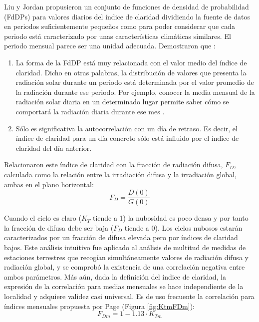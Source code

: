 Liu y Jordan propusieron un conjunto de funciones de densidad de probabilidad
(FdDPs) para valores diarios del índice de claridad dividiendo la
fuente de datos en periodos suficientemente pequeños como para poder
considerar que cada periodo está caracterizado por unas características
climáticas similares. El periodo mensual parece ser una unidad adecuada.
Demostraron que : 
\begin{enumerate}
\item La forma de la FdDP está muy relacionada con el valor medio del índice
de claridad. Dicho en otras palabras, la distribución de valores que
presenta la radiación solar durante un periodo está determinada por
el valor promedio de la radiación durante ese periodo. Por ejemplo,
conocer la media mensual de la radiación solar diaria en un determinado
lugar permite saber cómo se comportará la radiación diaria durante
ese mes \cite{Aguiar.Collares-Pereira1992}.
\item Sólo es significativa la autocorrelación con un día de retraso. Es
decir, el índice de claridad para un día concreto sólo está influido
por el índice de claridad del día anterior. 
\end{enumerate}
Relacionaron este índice de claridad con la fracción de radiación
difusa, $F_{D}$, calculada
como la relación entre la irradiación difusa y la irradiación global,
ambas en el plano horizontal:\begin{equation}
F_{D}=\frac{D(0)}{G(0)}\label{eq:FraccionDifusa}\end{equation}


Cuando el cielo es claro ($K_{T}$ tiende a 1) la nubosidad es poco
densa y por tanto la fracción de difusa debe ser baja ($F_{D}$ tiende
a 0). Los cielos nubosos estarán caracterizados por un fracción de
difusa elevada pero por índices de claridad bajos. Este análisis intuitivo
fue aplicado al análisis de multitud de medidas de estaciones terrestres
que recogían simultáneamente valores de radiación difusa y radiación
global, y se comprobó la existencia de una correlación negativa entre
ambos parámetros. Más aún, dada la definición del índice de claridad,
la expresión de la correlación para medias mensuales se hace independiente
de la localidad y adquiere validez casi universal. Es de uso frecuente
la correlación para índices mensuales propuesta por Page \cite{Page1961}(Figura
\ref{fig:KtmFDm}):\begin{equation}
F_{Dm}=1-1.13\cdot K_{Tm}\label{eq:Page}\end{equation}

